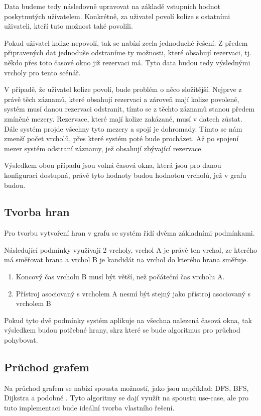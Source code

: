 Data budeme tedy následovně upravovat na základě vstupních hodnot poskytnutých uživatelem. Konkrétně, za uživatel povolí kolize s ostatními uživateli, kteří tuto možnost také povolili.

Pokud uživatel kolize nepovolí, tak se nabízí zcela jednoduché řešení. Z předem připravených dat jednoduše odstraníme ty možnosti, které obsahují rezervaci, tj. někdo přes toto časové okno již rezervaci má. Tyto data budou tedy výslednými vrcholy pro tento scénář.

V případě, že uživatel kolize povolí, bude problém o něco složitější. Nejprve z právě těch záznamů, které obsahují rezervaci a zároveň mají kolize povolené, systém musí danou rezervaci odstranit, tímto se z těchto záznamů stanou předem zmíněné mezery. Rezervace, které mají kolize zakázané, musí v datech zůstat. Dále systém projde všechny tyto mezery a spojí je dohromady.
Tímto se nám zmenší počet vrcholů, přes které systém poté bude procházet. Až po spojení mezer systém odstraní záznamy, jež obsahují zbývající rezervace.

Výsledkem obou případů jsou volná časová okna, která jsou pro danou konfiguraci dostupná, právě tyto hodnoty budou hodnotou vrcholů, jež v grafu budou.

\subsection{Tvorba hran}
Pro tvorbu vytvoření hran v grafu se systém řídí dvěma základními podmínkami.

Následující podmínky využívají 2 vrcholy, vrchol A je právě ten vrchol, ze kterého má směřovat hrana a vrchol B je kandidát na vrchol do kterého hrana směřuje.
\begin{enumerate}
    \item Koncový čas vrcholu B musí být větší, než počáteční čas vrcholu A.
    \item Přístroj asociovaný s vrcholem A nesmí být stejný jako přístroj asociovaný s vrcholem B
\end{enumerate}

Pokud tyto dvě podmínky systém aplikuje na všechna nalezená časová okna, tak výsledkem budou potřebné hrany, skrz které se bude algoritmus pro průchod pohybovat.


\subsection{Průchod grafem}
Na průchod grafem se nabízí spousta možností, jako jsou například: DFS, BFS, Dijkstra a podobně \cite{tarjan1972depth, bundy1984breadth, javaid2013understanding}. Tyto algoritmy se dají využít na spoustu use-case, ale pro tuto implementaci bude ideální tvorba vlastního řešení.

